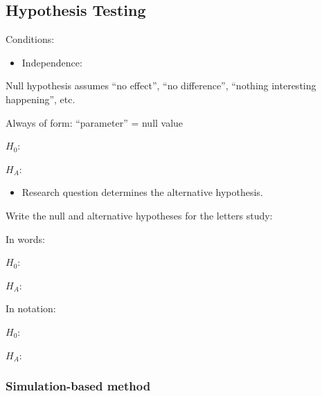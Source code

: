 \documentclass[
]{report}
\providecommand{\tightlist}{%
  \setlength{\itemsep}{0pt}\setlength{\parskip}{0pt}}
\newcommand{\rgi}{\hspace{24pt}}  %
\begin{document}
\hypertarget{hypothesis-testing-4}{%
\subsection*{Hypothesis Testing}\label{hypothesis-testing-4}}

Conditions:

\begin{itemize}
\tightlist
\item
  Independence:
\end{itemize}

\vspace{0.3in}

Null hypothesis assumes ``no effect'', ``no difference'', ``nothing interesting happening'', etc.

\rgi Always of form: ``parameter'' = null value

\(H_0:\)

\vspace{0.5in}

\(H_A:\)

\vspace{0.5in}

\begin{itemize}
\tightlist
\item
  Research question determines the alternative hypothesis.
\end{itemize}

Write the null and alternative hypotheses for the letters study:

In words:

\(H_0:\)

\vspace{0.5in}

\(H_A:\)

\vspace{0.5in}

In notation:

\(H_0:\)

\vspace{0.2in}

\(H_A:\)

\vspace{0.2in}

\hypertarget{simulation-based-method-5}{%
\subsubsection*{Simulation-based method}\label{simulation-based-method-5}}
\end{document}
